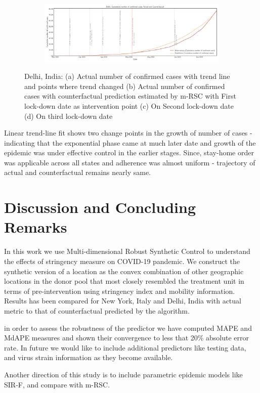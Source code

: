 \documentclass[preprint,authoryear,12pt]{elsarticle}
\begin{document}
\begin{figure}
		\begin{subfigure}[b]{\textwidth}
			\centering
			\includegraphics[width=0.8\linewidth,height=0.18\textheight]{Delhi_confirmed cases-L3-CUM}
		\end{subfigure}
		
		\caption[Delhi]{Delhi, India: (a) Actual number of confirmed cases with  trend line and points where trend changed (b) Actual number of confirmed cases with counterfactual prediction estimated by m-RSC with First lock-down date as intervention point (c) On Second lock-down date (d) On third  lock-down date}
		\label{fig7} 
	\end{figure}
	
	Linear trend-line fit shows two change points in the growth of number of cases - indicating that the exponential phase came at much later date and growth of the epidemic was under effective control in the earlier stages. Since, stay-home order was applicable across all states and adherence was almost uniform -  trajectory of actual and counterfactual remains nearly same.
	
	\section{Discussion and Concluding Remarks}
	\label{SEC5}
	In this work we use Multi-dimensional Robust Synthetic Control to understand the effects of stringency measure on COVID-19 pandemic. We construct the synthetic version of a location as the convex combination of other geographic locations in the donor pool that most closely resembled the treatment unit in terms of pre-intervention using stringency index and mobility information. 	Results has been compared for New York, Italy and Delhi, India with actual metric to that of counterfactual predicted by the algorithm.
	
	in order to assess the robustness of the predictor we have computed MAPE and MdAPE measures and shown their convergence to less that 20\% absolute error rate. In future we would like to include  additional predictors like testing data, and virus strain information as they become available. 
	
	Another direction of this study is to include parametric epidemic models like SIR-F\cite{Siettos2013}, and compare with m-RSC.
	
		
\end{document}
